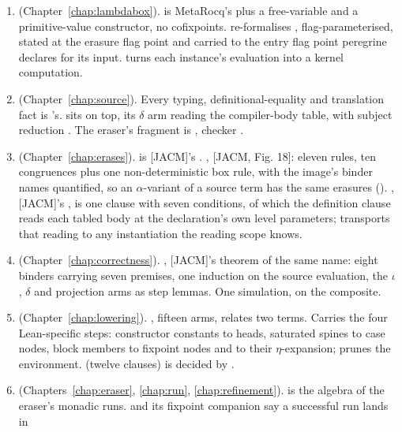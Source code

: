 \begin{enumerate}
\item {} (Chapter~\ref{chap:lambdabox}).  is MetaRocq's
 plus a free-variable and a primitive-value constructor, no cofixpoints.
\WcbvEval{} re-formalises , flag-parameterised, stated at the erasure flag point
and carried to the entry flag point peregrine declares for its input.  turns
each instance's evaluation into a kernel computation.
\item {} (Chapter~\ref{chap:source}). Every typing, definitional-equality and
translation fact is 's. \SEval{} sits on top, its $\delta$ arm reading the
compiler-body table, with subject reduction . The eraser's fragment is
, checker .
\item {} (Chapter~\ref{chap:erases}). \Erasable{} is [JACM]'s
. \Erases{}, [JACM, Fig. 18]: eleven rules, ten congruences plus one
non-deterministic box rule, with the image's binder names quantified, so an $\alpha$-variant of a
source term has the same erasures (). \ErasesEnv{}, [JACM]'s ,
is one clause with seven conditions, of which the definition clause reads each tabled body at the
declaration's own level parameters;  transports that reading to any
instantiation the reading scope knows.
\item {} (Chapter~\ref{chap:correctness}). , [JACM]'s
theorem of the same name: eight binders carrying seven premises, one induction on the source
evaluation, the $\iota$, $\delta$ and projection arms as step lemmas. One simulation, on the
composite.
\item {} (Chapter~\ref{chap:lowering}). \Lower{}, fifteen arms, relates two \lbox{}
terms. Carries the four Lean-specific steps: constructor constants to heads, saturated
 spines to case nodes, block members to fixpoint nodes and to their $\eta$-expansion;
\LowerEnv{} prunes the environment.  (twelve clauses) is decided by
.
\item {} (Chapters~\ref{chap:eraser}, \ref{chap:run},
\ref{chap:refinement}).  is the algebra of the eraser's monadic runs.
 and its fixpoint companion say a successful run lands in

\end{enumerate}
